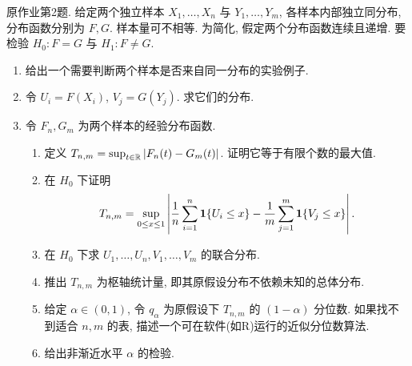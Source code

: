 \begin{exercise}\label{ps07:p02}
原作业第2题. 给定两个独立样本 $X_1,\ldots,X_n$ 与 $Y_1,\ldots,Y_m$, 各样本内部独立同分布, 分布函数分别为 $F,G$. 样本量可不相等. 为简化, 假定两个分布函数连续且递增. 要检验 $H_0:F=G$ 与 $H_1:F\ne G$.
\begin{enumerate}[label=\arabic*.]
\item 给出一个需要判断两个样本是否来自同一分布的实验例子.
\item 令 $U_i=F(X_i)$, $V_j=G(Y_j)$. 求它们的分布.
\item 令 $F_n,G_m$ 为两个样本的经验分布函数.
\begin{enumerate}[label=\alph*)]
\item 定义 $T_{n,m}=\sup_{t\in\mathbb R}|F_n(t)-G_m(t)|$. 证明它等于有限个数的最大值.
\item 在 $H_0$ 下证明
\[
T_{n,m}=\sup_{0\le x\le1}\left|\frac1n\sum_{i=1}^n\mathbf 1\{U_i\le x\}-\frac1m\sum_{j=1}^m\mathbf 1\{V_j\le x\}\right|.
\]
\item 在 $H_0$ 下求 $U_1,\ldots,U_n,V_1,\ldots,V_m$ 的联合分布.
\item 推出 $T_{n,m}$ 为枢轴统计量, 即其原假设分布不依赖未知的总体分布.
\item 给定 $\alpha\in(0,1)$, 令 $q_\alpha$ 为原假设下 $T_{n,m}$ 的 $(1-\alpha)$ 分位数. 如果找不到适合 $n,m$ 的表, 描述一个可在软件(如R)运行的近似分位数算法.
\item 给出非渐近水平 $\alpha$ 的检验.
\end{enumerate}
\end{enumerate}
\end{exercise}
